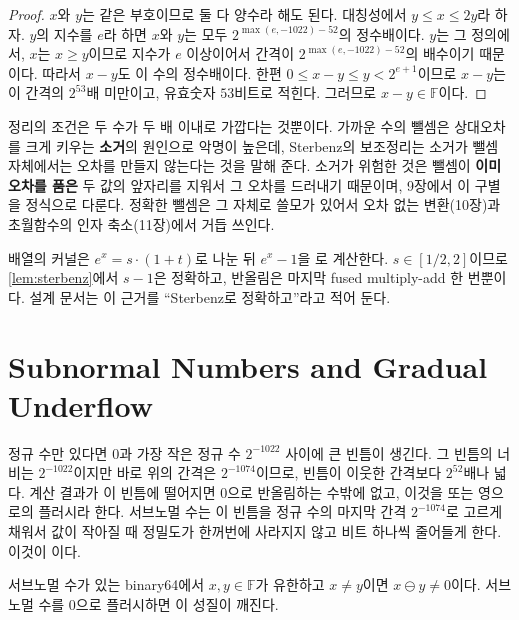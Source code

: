 \begin{proof}
$x$와 $y$는 같은 부호이므로 둘 다 양수라 해도 된다. 대칭성에서 $y\le x\le2y$라 하자. $y$의 지수를 $e$라 하면 $x$와 $y$는 모두 $2^{\max(e,-1022)-52}$의 정수배이다. $y$는 그 정의에서, $x$는 $x\ge y$이므로 지수가 $e$ 이상이어서 간격이 $2^{\max(e,-1022)-52}$의 배수이기 때문이다. 따라서 $x-y$도 이 수의 정수배이다. 한편 $0\le x-y\le y<2^{e+1}$이므로 $x-y$는 이 간격의 $2^{53}$배 미만이고, 유효숫자 $53$비트로 적힌다. 그러므로 $x-y\in\mathbb F$이다.
\end{proof}

정리의 조건은 두 수가 두 배 이내로 가깝다는 것뿐이다. 가까운 수의 뺄셈은 상대오차를 크게 키우는 \textbf{소거}의 원인으로 악명이 높은데, Sterbenz의 보조정리는 소거가 뺄셈 자체에서는 오차를 만들지 않는다는 것을 말해 준다. 소거가 위험한 것은 뺄셈이 \textbf{이미 오차를 품은} 두 값의 앞자리를 지워서 그 오차를 드러내기 때문이며, 9장에서 이 구별을 정식으로 다룬다. 정확한 뺄셈은 그 자체로 쓸모가 있어서 오차 없는 변환(10장)과 초월함수의 인자 축소(11장)에서 거듭 쓰인다.

\begin{instardust}
배열의  커널은 $e^x=s\cdot(1+t)$로 나눈 뒤 $e^x-1$을 로 계산한다. $s\in[1/2,2]$이므로 \cref{lem:sterbenz}에서 $s-1$은 정확하고, 반올림은 마지막 fused multiply-add 한 번뿐이다. 설계 문서는 이 근거를 ``Sterbenz로 정확하고''라고 적어 둔다.
\end{instardust}

\section{Subnormal Numbers and Gradual Underflow}
\label{sec:subnormal}

정규 수만 있다면 $0$과 가장 작은 정규 수 $2^{-1022}$ 사이에 큰 빈틈이 생긴다. 그 빈틈의 너비는 $2^{-1022}$이지만 바로 위의 간격은 $2^{-1074}$이므로, 빈틈이 이웃한 간격보다 $2^{52}$배나 넓다. 계산 결과가 이 빈틈에 떨어지면 $0$으로 반올림하는 수밖에 없고, 이것을  또는 영으로의 플러시라 한다. 서브노멀 수는 이 빈틈을 정규 수의 마지막 간격 $2^{-1074}$로 고르게 채워서 값이 작아질 때 정밀도가 한꺼번에 사라지지 않고 비트 하나씩 줄어들게 한다. 이것이 이다.

\begin{proposition}
\label{prop:gradual-underflow}
서브노멀 수가 있는 binary64에서 $x,y\in\mathbb F$가 유한하고 $x\ne y$이면 $x\ominus y\ne0$이다. 서브노멀 수를 $0$으로 플러시하면 이 성질이 깨진다.
\end{proposition}

